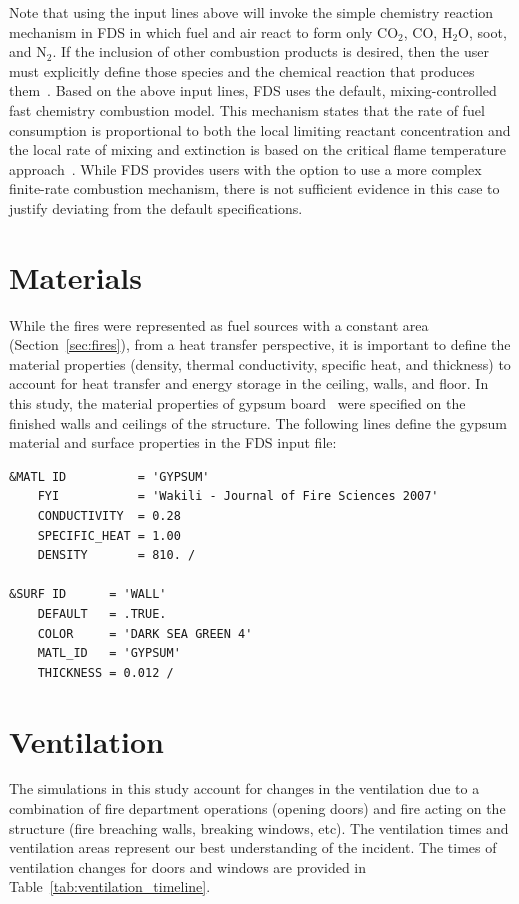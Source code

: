 \documentclass[12pt,oneside]{book}
\begin{document}
Note that using the input lines above will invoke the simple chemistry reaction mechanism in FDS in which fuel and air react to form only CO$_2$, CO, H$_2$O, soot, and N$_2$. If the inclusion of other combustion products is desired, then the user must explicitly define those species and the chemical reaction that produces them~\cite{FDS_Users_Guide}. Based on the above input lines, FDS uses the default, mixing-controlled fast chemistry combustion model. This mechanism states that the rate of fuel consumption is proportional to both the local limiting reactant concentration and the local rate of mixing and extinction is based on the critical flame temperature approach~\cite{FDS_Math_Guide}. While FDS provides users with the option to use a more complex finite-rate combustion mechanism, there is not sufficient evidence in this case to justify deviating from the default specifications.


\clearpage


\section{Materials}
\label{sec:materials}

While the fires were represented as fuel sources with a constant area (Section~\ref{sec:fires}), from a heat transfer perspective, it is important to define the material properties (density, thermal conductivity, specific heat, and thickness) to account for heat transfer and energy storage in the ceiling, walls, and floor. In this study, the material properties of gypsum board~\cite{WAKILI2007} were specified on the finished walls and ceilings of the structure. The following lines define the gypsum material and surface properties in the FDS input file:

\begin{lstlisting}
&MATL ID          = 'GYPSUM'
    FYI           = 'Wakili - Journal of Fire Sciences 2007' 
    CONDUCTIVITY  = 0.28
    SPECIFIC_HEAT = 1.00
    DENSITY       = 810. /

&SURF ID      = 'WALL'
    DEFAULT   = .TRUE.
    COLOR     = 'DARK SEA GREEN 4'
    MATL_ID   = 'GYPSUM'
    THICKNESS = 0.012 /
\end{lstlisting}

\section{Ventilation}
\label{sec:ventilation}

The simulations in this study account for changes in the ventilation due to a combination of fire department operations (opening doors) and fire acting on the structure (fire breaching walls, breaking windows, etc). The ventilation times and ventilation areas represent our best understanding of the incident. The times of ventilation changes for doors and windows are provided in Table~\ref{tab:ventilation_timeline}.
\end{document}
